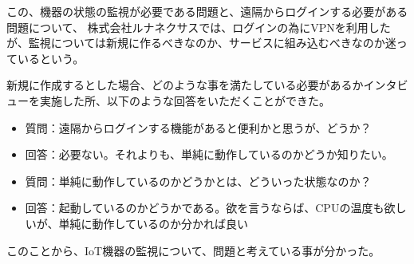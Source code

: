この、機器の状態の監視が必要である問題と、遠隔からログインする必要がある問題について、
株式会社ルナネクサスでは、ログインの為にVPNを利用したが、監視については新規に作るべきなのか、サービスに組み込むべきなのか迷っているという。

新規に作成するとした場合、どのような事を満たしている必要があるかインタビューを実施した所、以下のような回答をいただくことができた。
\begin{itemize}
\item 質問：遠隔からログインする機能があると便利かと思うが、どうか？
\item 回答：必要ない。それよりも、単純に動作しているのかどうか知りたい。
\item 質問：単純に動作しているのかどうかとは、どういった状態なのか？
\item 回答：起動しているのかどうかである。欲を言うならば、CPUの温度も欲しいが、単純に動作しているのか分かれば良い
\end{itemize}

このことから、IoT機器の監視について、問題と考えている事が分かった。

